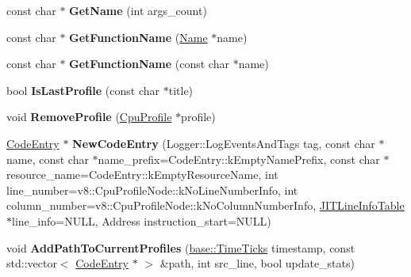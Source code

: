 \begin{DoxyCompactItemize}
\item 
const char $\ast$ {\bfseries Get\+Name} (int args\+\_\+count)\hypertarget{classv8_1_1internal_1_1_cpu_profiles_collection_a1e6314d9d094fef12d5dfaf8342636a9}{}\label{classv8_1_1internal_1_1_cpu_profiles_collection_a1e6314d9d094fef12d5dfaf8342636a9}

\item 
const char $\ast$ {\bfseries Get\+Function\+Name} (\hyperlink{classv8_1_1internal_1_1_name}{Name} $\ast$name)\hypertarget{classv8_1_1internal_1_1_cpu_profiles_collection_a42312f9ef00d25758325a14afe1d695a}{}\label{classv8_1_1internal_1_1_cpu_profiles_collection_a42312f9ef00d25758325a14afe1d695a}

\item 
const char $\ast$ {\bfseries Get\+Function\+Name} (const char $\ast$name)\hypertarget{classv8_1_1internal_1_1_cpu_profiles_collection_aeb63cb9ff59e5585d9c0c82396c6f82d}{}\label{classv8_1_1internal_1_1_cpu_profiles_collection_aeb63cb9ff59e5585d9c0c82396c6f82d}

\item 
bool {\bfseries Is\+Last\+Profile} (const char $\ast$title)\hypertarget{classv8_1_1internal_1_1_cpu_profiles_collection_ac5981b296e5fdb7fb06c22dab3548d64}{}\label{classv8_1_1internal_1_1_cpu_profiles_collection_ac5981b296e5fdb7fb06c22dab3548d64}

\item 
void {\bfseries Remove\+Profile} (\hyperlink{classv8_1_1internal_1_1_cpu_profile}{Cpu\+Profile} $\ast$profile)\hypertarget{classv8_1_1internal_1_1_cpu_profiles_collection_a4c4bf98364eb1a14e61667f1893faeb4}{}\label{classv8_1_1internal_1_1_cpu_profiles_collection_a4c4bf98364eb1a14e61667f1893faeb4}

\item 
\hyperlink{classv8_1_1internal_1_1_code_entry}{Code\+Entry} $\ast$ {\bfseries New\+Code\+Entry} (Logger\+::\+Log\+Events\+And\+Tags tag, const char $\ast$name, const char $\ast$name\+\_\+prefix=Code\+Entry\+::k\+Empty\+Name\+Prefix, const char $\ast$resource\+\_\+name=Code\+Entry\+::k\+Empty\+Resource\+Name, int line\+\_\+number=v8\+::\+Cpu\+Profile\+Node\+::k\+No\+Line\+Number\+Info, int column\+\_\+number=v8\+::\+Cpu\+Profile\+Node\+::k\+No\+Column\+Number\+Info, \hyperlink{classv8_1_1internal_1_1_j_i_t_line_info_table}{J\+I\+T\+Line\+Info\+Table} $\ast$line\+\_\+info=N\+U\+LL, Address instruction\+\_\+start=N\+U\+LL)\hypertarget{classv8_1_1internal_1_1_cpu_profiles_collection_aa4f91fcedf25af009fc0104f3288939e}{}\label{classv8_1_1internal_1_1_cpu_profiles_collection_aa4f91fcedf25af009fc0104f3288939e}

\item 
void {\bfseries Add\+Path\+To\+Current\+Profiles} (\hyperlink{classv8_1_1base_1_1_time_ticks}{base\+::\+Time\+Ticks} timestamp, const std\+::vector$<$ \hyperlink{classv8_1_1internal_1_1_code_entry}{Code\+Entry} $\ast$ $>$ \&path, int src\+\_\+line, bool update\+\_\+stats)\hypertarget{classv8_1_1internal_1_1_cpu_profiles_collection_a8bd0836f447be202143d43571698ebf8}{}\label{classv8_1_1internal_1_1_cpu_profiles_collection_a8bd0836f447be202143d43571698ebf8}

\end{DoxyCompactItemize}

